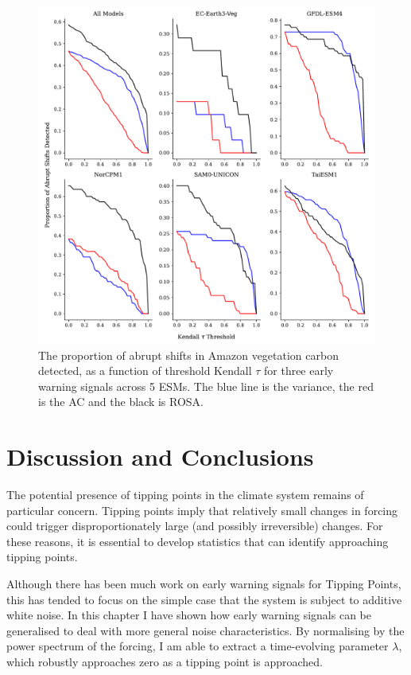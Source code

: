 \begin{figure}
\includegraphics[width=\textwidth,keepaspectratio]{figure4}
\caption[ROSA in CMIP6]{The proportion of abrupt shifts in Amazon vegetation carbon
detected, as a function of threshold Kendall $\tau$ for three early warning signals across 5 ESMs. The blue line is the variance,
the red is the AC and the black is ROSA.}\label{fig:complex_test}
\end{figure}



\section{Discussion and Conclusions}
The potential presence of tipping points in the climate system remains of particular concern. 
Tipping points imply that relatively small changes in forcing could trigger
disproportionately large (and possibly irreversible) changes.
For these reasons, it is essential to develop
statistics that can identify approaching tipping points.

Although there has been much work on early warning signals for Tipping Points,
this has tended to focus on the simple case that the system is subject to additive white noise. 
In this chapter I have shown how early warning signals can be generalised to deal with more general noise characteristics. By normalising by the power spectrum of the forcing, I am able to extract a 
time-evolving parameter $\lambda$, which robustly approaches zero as a tipping point is approached.  

